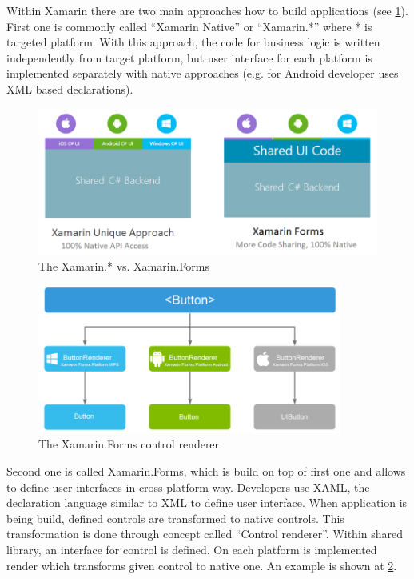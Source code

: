 Within Xamarin there are two main approaches how to build applications (see \cref{fig:xamarin-native-vs-forms}). First one is commonly called ``Xamarin Native'' or ``Xamarin.*'' where * is targeted platform. With this approach, the code for business logic is written independently from target platform, but user interface for each platform is implemented separately with native approaches (e.g. for Android developer uses XML based declarations).

\begin{figure}[ht!]
\centering
\includegraphics[width=12cm,keepaspectratio]{img/xamarin-vs-xamarin-forms}
\caption{The Xamarin.* vs. Xamarin.Forms \cite{xamarin-native-forms}}
\label{fig:xamarin-native-vs-forms}
\end{figure}

\begin{figure}[ht!]
\centering
\includegraphics[width=10cm,keepaspectratio]{img/xamarin-forms-ui-render}
\caption{The Xamarin.Forms control renderer \cite{xamarin-native-forms}}
\label{fig:xamarin-ui-renderer}
\end{figure}

Second one is called Xamarin.Forms, which is build on top of first one and allows to define user interfaces in cross-platform way. Developers use XAML, the declaration language similar to XML to define user interface. When application is being build, defined controls are transformed to native controls. This transformation is done through concept called ``Control renderer''. Within shared library, an interface for control is defined. On each platform is implemented render which transforms given control to native one. An example is shown at \cref{fig:xamarin-ui-renderer}.
